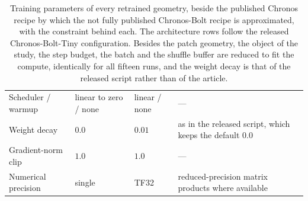 \begin{table}[!tbp]
\begin{tabular}{@{}M{3.6cm}M{4.4cm}M{2.2cm}M{5.0cm}@{}}
        \rowsep%
        Scheduler / warmup          & linear to zero / none              & linear / none       & --- \\
        \rowsep%
        Weight decay                & $0.0$                              & $0.01$              & as in the released script, which keeps the default $0.0$ \\
        \rowsep%
        Gradient-norm clip          & $1.0$                              & $1.0$               & --- \\
        \rowsep%
        Numerical precision         & single                             & TF32                & reduced-precision matrix products where available \\
        \bottomrule
    \end{tabular}
\caption{Training parameters of every retrained geometry, beside the published Chronos recipe\autocite{ansariChronosLearningLanguage2024} by which the not fully published Chronos-Bolt recipe is approximated, with the constraint behind each. The architecture rows follow the released Chronos-Bolt-Tiny configuration. Besides the patch geometry, the object of the study, the step budget, the batch and the shuffle buffer are reduced to fit the compute, identically for all fifteen runs, and the weight decay is that of the released script rather than of the article.}%
    \label{tab:trainParams}
\end{table}
